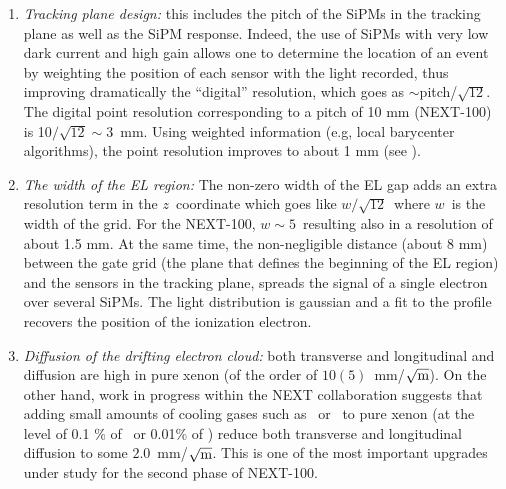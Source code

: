 \documentclass[a4paper,11pt]{article}
\begin{document}
\begin{enumerate}
\item {\em Tracking plane design:} this includes the pitch of the SiPMs in the tracking plane as well as the SiPM response. Indeed, the use of SiPMs with very low dark current and high gain allows one to determine the location of an event by weighting the position of each sensor with the light recorded, thus improving dramatically the ``digital'' resolution, which goes as $\sim$pitch/$\sqrt{12}$. The digital point resolution corresponding to a pitch of 10 mm (NEXT-100) is 10$/\sqrt{12} \sim 3$~mm. Using weighted information (e.g, local barycenter algorithms), the point resolution improves to about 1 mm (see \cite{Lorca:2014sra}). 
\item {\em The width of the EL region:}
The non-zero width of the EL gap adds an extra resolution term in the $z$~coordinate which goes like $w/\sqrt{12}$~where $w$~is the width of the grid. For the NEXT-100, $w\sim 5$~resulting also in a resolution of about 1.5 mm. At the same time, the non-negligible distance (about 8 mm) between the gate grid (the plane that defines the beginning of the EL region) and the sensors in the tracking plane, spreads the signal of a single electron over several SiPMs. The light distribution is gaussian and a fit to the profile recovers the position of the ionization electron.
\item {\em Diffusion of the drifting electron cloud:}  both transverse and  longitudinal and  diffusion are high in pure xenon (of the order of $10 (5) $~mm/$\sqrt{\rm{m}}$). On the other hand, work in progress within the NEXT collaboration \cite{Azevedo:2015eok} suggests that adding small amounts of cooling gases such as \CHF\ or \CFF\ to pure xenon (at the level of 0.1 \% of \CHF\ or 0.01\% of \CFF) reduce both transverse and longitudinal diffusion to some $2.0$~mm/$\sqrt{\rm{m}}$. This is one of the most important upgrades under study for the second phase of NEXT-100. 
\end{enumerate}

%
\end{document}
